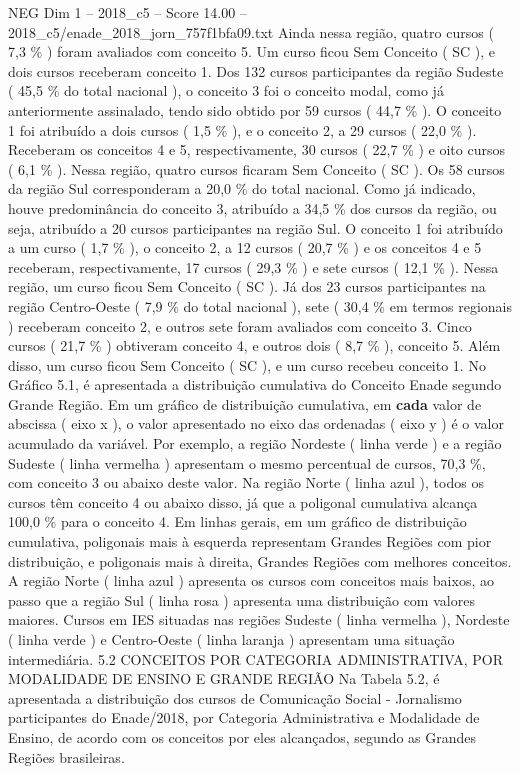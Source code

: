 \begin{textsample}{NEG Dim 1 – 2018\_c5 – Score 14.00 – 2018\_c5/enade\_2018\_jorn\_757f1bfa09.txt}
Ainda nessa região, quatro cursos ( 7,3 \% ) foram avaliados com conceito 5.
Um curso ficou Sem Conceito ( SC ), e dois cursos receberam conceito 1.
Dos 132 cursos participantes da região Sudeste ( 45,5 \% do total nacional ), o conceito 3 foi o conceito modal, como já anteriormente assinalado, tendo sido obtido por 59 cursos ( 44,7 \% ).
O conceito 1 foi atribuído a dois cursos ( 1,5 \% ), e o conceito 2, a 29 cursos ( 22,0 \% ).
Receberam os conceitos 4 e 5, respectivamente, 30 cursos ( 22,7 \% ) e oito cursos ( 6,1 \% ).
Nessa região, quatro cursos ficaram Sem Conceito ( SC ).
Os 58 cursos da região Sul corresponderam a 20,0 \% do total nacional.
Como já indicado, houve predominância do conceito 3, atribuído a 34,5 \% dos cursos da região, ou seja, atribuído a 20 cursos participantes na região Sul.
O conceito 1 foi atribuído a um curso ( 1,7 \% ), o conceito 2, a 12 cursos ( 20,7 \% ) e os conceitos 4 e 5 receberam, respectivamente, 17 cursos ( 29,3 \% ) e sete cursos ( 12,1 \% ).
Nessa região, um curso ficou Sem Conceito ( SC ).
Já dos 23 cursos participantes na região Centro-Oeste ( 7,9 \% do total nacional ), sete ( 30,4 \% em termos regionais ) receberam conceito 2, e outros sete foram avaliados com conceito 3.
Cinco cursos ( 21,7 \% ) obtiveram conceito 4, e outros dois ( 8,7 \% ), conceito 5.
Além disso, um curso ficou Sem Conceito ( SC ), e um curso recebeu conceito 1.
No Gráfico 5.1, é apresentada a distribuição cumulativa do Conceito Enade segundo Grande Região.
Em um gráfico de distribuição cumulativa, em \textbf{cada} valor de abscissa ( eixo x ), o valor apresentado no eixo das ordenadas ( eixo y ) é o valor acumulado da variável.
Por exemplo, a região Nordeste ( linha verde ) e a região Sudeste ( linha vermelha ) apresentam o mesmo percentual de cursos, 70,3 \%, com conceito 3 ou abaixo deste valor.
Na região Norte ( linha azul ), todos os cursos têm conceito 4 ou abaixo disso, já que a poligonal cumulativa alcança 100,0 \% para o conceito 4.
Em linhas gerais, em um gráfico de distribuição cumulativa, poligonais mais à esquerda representam Grandes Regiões com pior distribuição, e poligonais mais à direita, Grandes Regiões com melhores conceitos.
A região Norte ( linha azul ) apresenta os cursos com conceitos mais baixos, ao passo que a região Sul ( linha rosa ) apresenta uma distribuição com valores maiores.
Cursos em IES situadas nas regiões Sudeste ( linha vermelha ), Nordeste ( linha verde ) e Centro-Oeste ( linha laranja ) apresentam uma situação intermediária. 5.2 CONCEITOS POR CATEGORIA ADMINISTRATIVA, POR MODALIDADE DE ENSINO E GRANDE REGIÃO Na Tabela 5.2, é apresentada a distribuição dos cursos de Comunicação Social - Jornalismo participantes do Enade/2018, por Categoria Administrativa e Modalidade de Ensino, de acordo com os conceitos por eles alcançados, segundo as Grandes Regiões brasileiras.

\end{textsample}
